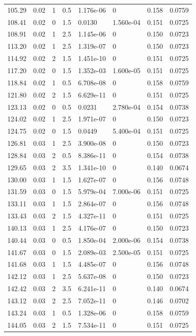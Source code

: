 \documentclass[preview]{standalone}
\begin{document}
{{{\begin{tabular}{L{1.2cm}C{1.2cm} C{0.3cm}C{0.5cm} C{1.4cm}C{1.4cm} C{1.4cm}C{1.4cm}}
  105.29  &  0.02  & 1     & 0.5 &  1.176e-06  & 0  & 0.158 &  0.0759   \\ 
  108.41  &  0.02  & 0     & 1.5 &  0.0130  & 1.560e-04  & 0.151 &  0.0725   \\ 
  108.91  &  0.02  & 1     & 2.5 &  1.145e-06  & 0  & 0.150 &  0.0723   \\ 
  113.20  &  0.02  & 1     & 2.5 &  1.319e-07  & 0  & 0.150 &  0.0723   \\ 
  114.92  &  0.02  & 2     & 1.5 &  1.451e-10  & 0  & 0.151 &  0.0725   \\ 
  117.20  &  0.02  & 0     & 1.5 &  1.352e-03  & 1.600e-05  & 0.151 &  0.0725   \\ 
  118.84  &  0.02  & 1     & 0.5 &  6.708e-08  & 0  & 0.158 &  0.0759   \\ 
  121.80  &  0.02  & 2     & 1.5 &  6.629e-11  & 0  & 0.151 &  0.0725   \\ 
  123.13  &  0.02  & 0     & 0.5 &  0.0231  & 2.780e-04  & 0.154 &  0.0738   \\ 
  124.02  &  0.02  & 1     & 2.5 &  1.971e-07  & 0  & 0.150 &  0.0723   \\ 
  124.75  &  0.02  & 0     & 1.5 &  0.0449  & 5.400e-04  & 0.151 &  0.0725   \\ 
  126.81  &  0.03  & 1     & 2.5 &  3.900e-08  & 0  & 0.150 &  0.0723   \\ 
  128.84  &  0.03  & 2     & 0.5 &  8.386e-11  & 0  & 0.154 &  0.0738   \\ 
  129.65  &  0.03  & 2     & 3.5 &  1.341e-10  & 0  & 0.140 &  0.0674   \\ 
  130.00  &  0.03  & 1     & 1.5 &  1.627e-07  & 0  & 0.156 &  0.0748   \\ 
  131.59  &  0.03  & 0     & 1.5 &  5.979e-04  & 7.000e-06  & 0.151 &  0.0725   \\ 
  133.11  &  0.03  & 1     & 1.5 &  2.864e-07  & 0  & 0.156 &  0.0748   \\ 
  133.43  &  0.03  & 2     & 1.5 &  4.327e-11  & 0  & 0.151 &  0.0725   \\ 
  140.13  &  0.03  & 1     & 2.5 &  4.176e-07  & 0  & 0.150 &  0.0723   \\ 
  140.44  &  0.03  & 0     & 0.5 &  1.850e-04  & 2.000e-06  & 0.154 &  0.0738   \\ 
  141.67  &  0.03  & 0     & 1.5 &  2.089e-03  & 2.500e-05  & 0.151 &  0.0725   \\ 
  141.68  &  0.03  & 1     & 1.5 &  4.485e-07  & 0  & 0.156 &  0.0748   \\ 
  142.12  &  0.03  & 1     & 2.5 &  5.637e-08  & 0  & 0.150 &  0.0723   \\ 
  142.42  &  0.03  & 2     & 3.5 &  6.241e-11  & 0  & 0.140 &  0.0674   \\ 
  143.12  &  0.03  & 2     & 2.5 &  7.052e-11  & 0  & 0.146 &  0.0702   \\ 
  143.24  &  0.03  & 1     & 0.5 &  1.328e-06  & 0  & 0.158 &  0.0759   \\ 
  144.05  &  0.03  & 2     & 1.5 &  7.534e-11  & 0  & 0.151 &  0.0725   \\ 
\hline 
\end{tabular} 

}}}
\end{document}

